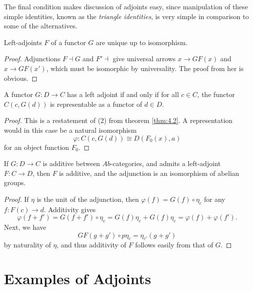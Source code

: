 The final condition makes discussion of adjoints easy, since manipulation of these simple identities, known as the \emph{triangle identities}, is very simple in comparison to some of the alternatives.

\begin{corollary}\label{cor:4.1}
	Left-adjoints $F$ of a functor $G$ are unique up to isomorphism.
\end{corollary}
\begin{proof}
	Adjunctions $F\dashv G$ and $F'\dashv$ give universal arrows $x\to GF(x)$ and $x\to GF(x')$, which must be isomorphic by universality. The proof from her is obvious.
\end{proof}
\begin{corollary}\label{cor:4.2}
	A functor $G : D \to C$ has a left adjoint if and only if for all $c\in C$, the functor $C(c,G(d))$ is representable as a functor of $d\in D$.
\end{corollary}
\begin{proof}
	This is a restatement of (2) from theorem \ref{thm:4.2}. A representation would in this case be a natural isomorphism
	\[
		\varphi : C(c,G(d))\cong D(F_0(x),a)
	\]
	for an object function $F_0$.
\end{proof}

\begin{theorem}\label{thm:4.3}
	If $G : D \to C$ is additive between $Ab$-categories, and admits a left-adjoint $F : C \to D$, then $F$ is additive, and the adjunction is an isomorphism of abelian groups.
\end{theorem}
\begin{proof}
	If $\eta $ is the unit of the adjunction, then $\varphi (f)=G(f)\circ \eta _c$ for any $f : F(c) \to d$. Additivity gives
	\[
		\varphi (f+f')=G(f+f')\circ \eta _c=G(f)\eta _c + G(f)\eta _c=\varphi (f)+\varphi (f')
	.\]
	Next, we have
	\[
		GF(g+g')\circ p\eta _c=\eta _{c'} (g+g')
	\]
	by naturality of $\eta $, and thus additivity of $F$ follows easily from that of $G$.
\end{proof}

\section{Examples of Adjoints}

